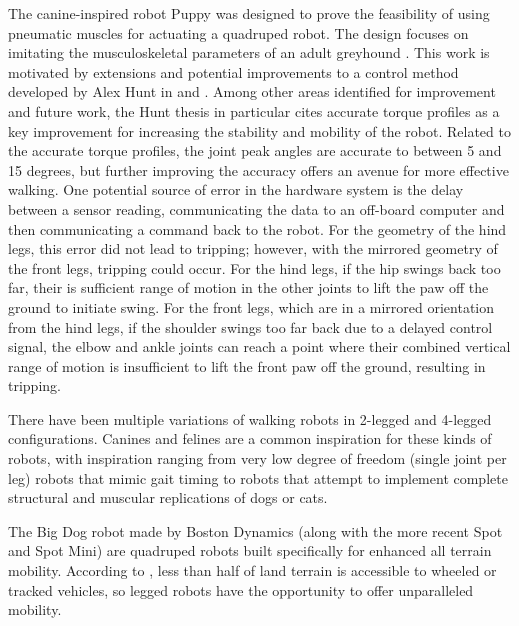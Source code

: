 
The canine-inspired robot Puppy was designed to prove the feasibility of using
pneumatic muscles for actuating a quadruped robot. The design focuses on 
imitating the musculoskeletal parameters of an adult greyhound 
\cite{PuppyDesign}. This work is motivated by extensions and potential
improvements to a control method developed by Alex Hunt in
\cite{HuntPhDThesis} and \cite{HuntHindLegWalking}. Among other areas identified
for improvement and future work, the Hunt thesis in particular cites accurate torque
profiles as a key improvement for increasing the stability and mobility of the
robot. Related to the accurate torque profiles, the joint peak angles are
accurate to between 5 and 15 degrees, but further improving the accuracy offers
an avenue for more effective walking. One potential source of error in the
hardware system is the delay between a sensor reading, communicating the data to
an off-board computer and then communicating a command back to the robot. For the geometry of the hind legs, this error did not lead to tripping; however, with the mirrored geometry of the front legs, tripping could occur. For the hind legs, if the hip swings back too far, their is sufficient range of motion in the other joints to lift the paw off the ground to initiate swing. For the front legs, which are in a mirrored orientation from the hind legs, if the shoulder swings too far back due to a delayed control signal, the elbow and ankle joints can reach a point where their combined vertical range of motion is insufficient to lift the front paw off the ground, resulting in tripping.


There have been multiple variations of walking robots in 2-legged and 4-legged
configurations. Canines and felines are a common inspiration for these kinds of
robots, with inspiration ranging from very low degree of freedom (single joint
per leg) robots that mimic gait timing to robots that attempt to implement
complete structural and muscular replications of dogs or cats.


The Big Dog robot made by Boston Dynamics (along with the more recent Spot and
Spot Mini) are quadruped robots built specifically for enhanced all terrain
mobility. According to \cite{BigDog}, less than half of land terrain is
accessible to wheeled or tracked vehicles, so legged robots have the opportunity
to offer unparalleled mobility.


